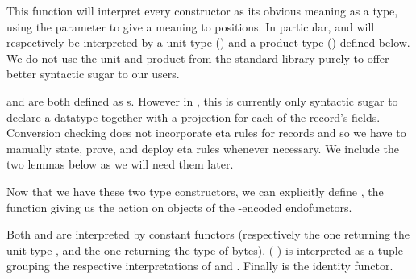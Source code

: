 This function will interpret every  constructor
as its obvious meaning as a type, using the parameter to give a
meaning to  positions.
%
In particular,  and  will
respectively be interpreted by a unit type ()
and a product type () defined below.
%
We do not use the unit and product from the standard
library purely to offer better syntactic sugar to
our users.

\noindent
\begin{minipage}[t]{.4\textwidth}
\end{minipage}\hfill
\begin{minipage}[t]{.5\textwidth}
\end{minipage}

\begin{remark}\label{rmk:etarecords}
   and  are both defined
  as s.
  However in \idris{}, this is currently only syntactic sugar
  to declare a datatype together with a projection for each
  of the record's fields.
  Conversion checking does not incorporate eta rules for records
  and so we have to manually state, prove, and deploy eta rules
  whenever necessary.
  We include the two lemmas below as we will need them later.

  \label{fig:etatrue}
  \label{fig:etatuple}
\end{remark}

Now that we have these two type constructors, we can explicitly
define , the function giving
us the action on objects of the -encoded
endofunctors.


Both  and  are interpreted by constant
functors (respectively the one returning the unit type ,
and the one returning the type of bytes).
%
(  )
is interpreted as a tuple grouping the respective interpretations
of  and .
%
Finally  is the identity functor.




